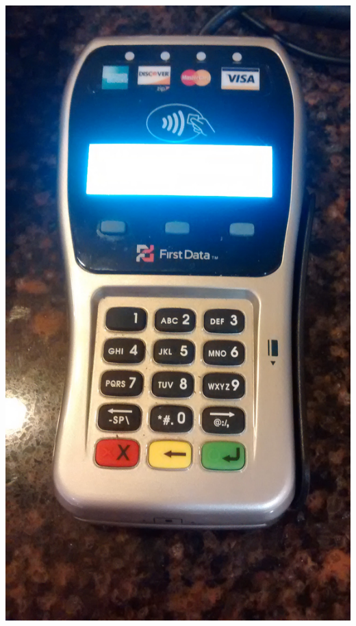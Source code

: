 \documentclass[unknownkeysallowed]{beamer}
\begin{document}
\begin{frame}
\begin{block}{}
\begin{center}
        \includegraphics[width=\linewidth,height=0.3\textheight,keepaspectratio]{figures/higbies.jpg}
      \end{center}
    \end{block}
\end{frame}
\end{document}
